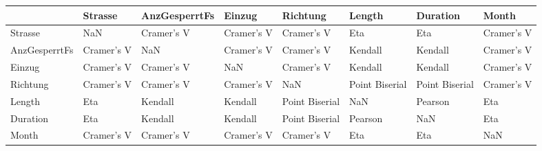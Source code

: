\begin{tabular}{llllllll}
\toprule
{} &     Strasse & AnzGesperrtFs &      Einzug &        Richtung &          Length &        Duration &       Month \\
\midrule
Strasse       &         NaN &    Cramer's V &  Cramer's V &      Cramer's V &             Eta &             Eta &  Cramer's V \\
AnzGesperrtFs &  Cramer's V &           NaN &  Cramer's V &      Cramer's V &         Kendall &         Kendall &  Cramer's V \\
Einzug        &  Cramer's V &    Cramer's V &         NaN &      Cramer's V &         Kendall &         Kendall &  Cramer's V \\
Richtung      &  Cramer's V &    Cramer's V &  Cramer's V &             NaN &  Point Biserial &  Point Biserial &  Cramer's V \\
Length        &         Eta &       Kendall &     Kendall &  Point Biserial &             NaN &         Pearson &         Eta \\
Duration      &         Eta &       Kendall &     Kendall &  Point Biserial &         Pearson &             NaN &         Eta \\
Month         &  Cramer's V &    Cramer's V &  Cramer's V &      Cramer's V &             Eta &             Eta &         NaN \\
\bottomrule
\end{tabular}
